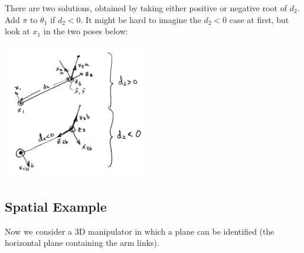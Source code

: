 \begin{ExampleCont}
There are two solutions, obtained by taking either positive or
negative root of $d_2$.  Add $\pi$ to $\theta_1$ if $d_2 < 0$.
It might be hard to imagine the $d_2<0$ case at first, but look at $x_1$ in the two poses below:
\begin{center}
\includegraphics[width=2.5in]{figs04/01125.png}
\end{center}

\end{ExampleCont}


\subsection{Spatial Example}

Now we consider a 3D manipulator in which a plane can be identified (the horizontal plane containing the arm links).

